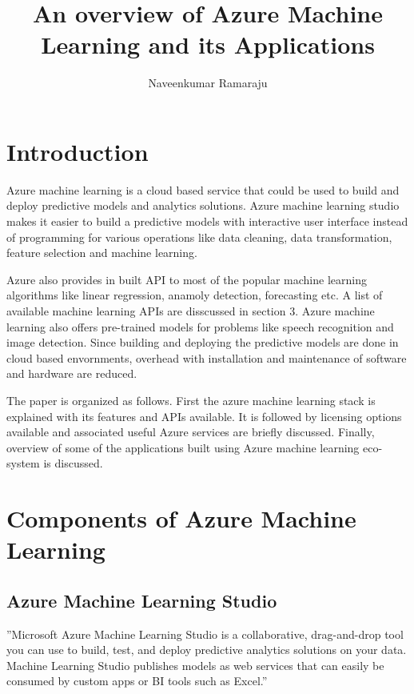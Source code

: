 \documentclass[9pt,twocolumn,twoside]{styles/osajnl}
\title{An overview of Azure Machine Learning and its Applications}
\author[1]{Naveenkumar Ramaraju}
\affil[1]{School of Informatics and Computing, Bloomington, IN 47408, U.S.A.}
\affil[*]{Corresponding authors: nramraj@umail.iu.edu}
\begin{document}
\maketitle

\section{Introduction}

Azure machine learning is a cloud based service that could be used to
build and deploy predictive models and analytics solutions. Azure
machine learning studio makes it easier to build a predictive models
with interactive user interface instead of programming for various
operations like data cleaning, data transformation, feature selection
and machine learning.

Azure also provides in built API to most of the popular machine
learning algorithms like linear regression, anamoly detection,
forecasting etc. A list of available machine learning APIs are
disscussed in section 3. Azure machine learning also offers
pre-trained models for problems like speech recognition and image
detection. Since building and deploying the predictive
models are done in cloud based envornments, overhead with installation
and maintenance of software and hardware are reduced.  

The paper is organized as follows. First the azure machine learning
stack is explained with its features and APIs available. It is
followed by licensing options available and associated useful Azure
services are briefly discussed. Finally, overview of some of the
applications built using Azure machine learning eco-system is
discussed.



\section{Components of Azure Machine Learning}

\subsection{Azure Machine Learning Studio}

''Microsoft Azure Machine Learning Studio is a collaborative,
drag-and-drop tool you can use to build, test, and deploy predictive
analytics solutions on your data. Machine Learning Studio publishes
models as web services that can easily be consumed by custom apps or
BI tools such as Excel.'' \cite{www-azureMLStudioSite} 
\end{document}
